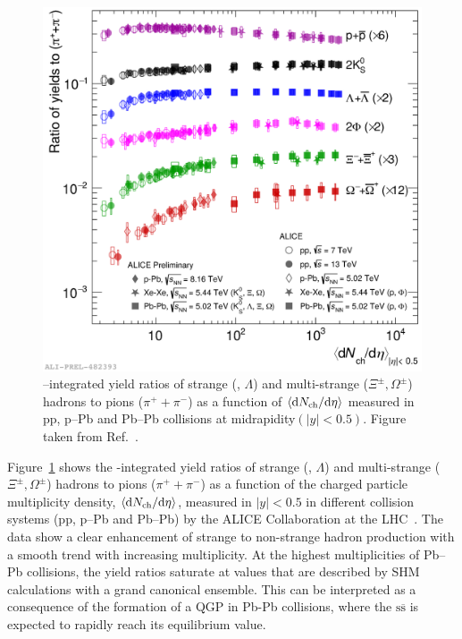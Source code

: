 \begin{figure}[htb]
  \centering
  \includegraphics[width=0.7\linewidth]{Figures/Chapter 1/img_ToPionRatios_1.pdf}
  \caption{\pt--integrated yield ratios of strange (\kzs, $\Lambda$) and multi-strange ($\Xi^\pm, \Omega^\pm$) hadrons to pions ($\pi^++\pi^-$) as a function of $\braket{\mathrm{d} N_\mathrm{ch}/\mathrm{d}\eta}$ measured in pp, p--Pb and Pb--Pb collisions at midrapidity$(\lvert y\rvert<0.5)$. Figure taken from Ref.~\cite{ALICE_figures}.}
  \label{fig:StrangenessEnhancement}
\end{figure}

Figure~\ref{fig:StrangenessEnhancement} shows the \pt-integrated yield ratios of strange (\kzs, $\Lambda$) and multi-strange ($\Xi^\pm, \Omega^\pm$) hadrons to pions ($\pi^++\pi^-$) as a function of the charged particle multiplicity density, $\braket{\mathrm{d} N_\mathrm{ch}/\mathrm{d}\eta}$, measured in $\lvert y\rvert<0.5$ in different collision systems (pp, p--Pb and Pb--Pb) by the ALICE Collaboration at the LHC~\cite{ALICE:2016fzo}. The data show a clear enhancement of strange to non-strange hadron production with a smooth trend with increasing multiplicity. At the highest multiplicities of Pb--Pb collisions, the yield ratios saturate at values that are described by SHM calculations with a grand canonical ensemble. This can be interpreted as a consequence of the formation of a QGP in Pb-Pb collisions, where the $\mathrm{s\overline{s}}$ is expected to rapidly reach its equilibrium value.



